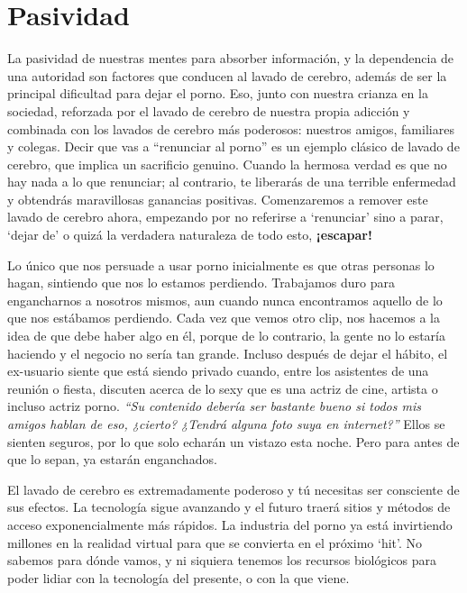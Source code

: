 \documentclass[
  spanish,
  openany]{book}
\begin{document}
\hypertarget{pasividad}{%
\section{Pasividad}\label{pasividad}}

La pasividad de nuestras mentes para absorber información, y la dependencia de una autoridad son factores que conducen al lavado de cerebro, además de ser la principal dificultad para dejar el porno. Eso, junto con nuestra crianza en la sociedad, reforzada por el lavado de cerebro de nuestra propia adicción y combinada con los lavados de cerebro más poderosos: nuestros amigos, familiares y colegas. Decir que vas a ``renunciar al porno'' es un ejemplo clásico de lavado de cerebro, que implica un sacrificio genuino. Cuando la hermosa verdad es que no hay nada a lo que renunciar; al contrario, te liberarás de una terrible enfermedad y obtendrás maravillosas ganancias positivas. Comenzaremos a remover este lavado de cerebro ahora, empezando por no referirse a `renunciar' sino a parar, `dejar de' o quizá la verdadera naturaleza de todo esto, \textbf{¡escapar!}

Lo único que nos persuade a usar porno inicialmente es que otras personas lo hagan, sintiendo que nos lo estamos perdiendo. Trabajamos duro para engancharnos a nosotros mismos, aun cuando nunca encontramos aquello de lo que nos estábamos perdiendo. Cada vez que vemos otro clip, nos hacemos a la idea de que debe haber algo en él, porque de lo contrario, la gente no lo estaría haciendo y el negocio no sería tan grande. Incluso después de dejar el hábito, el ex-usuario siente que está siendo privado cuando, entre los asistentes de una reunión o fiesta, discuten acerca de lo sexy que es una actriz de cine, artista o incluso actriz porno. \emph{``Su contenido debería ser bastante bueno si todos mis amigos hablan de eso, ¿cierto? ¿Tendrá alguna foto suya en internet?''} Ellos se sienten seguros, por lo que solo echarán un vistazo esta noche. Pero para antes de que lo sepan, ya estarán enganchados.

El lavado de cerebro es extremadamente poderoso y tú necesitas ser consciente de sus efectos. La tecnología sigue avanzando y el futuro traerá sitios y métodos de acceso exponencialmente más rápidos. La industria del porno ya está invirtiendo millones en la realidad virtual para que se convierta en el próximo `hit'. No sabemos para dónde vamos, y ni siquiera tenemos los recursos biológicos para poder lidiar con la tecnología del presente, o con la que viene.
\end{document}

